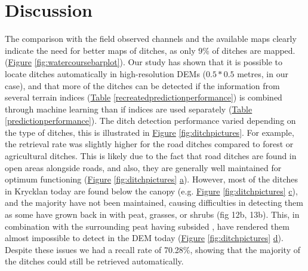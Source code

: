 \documentclass[]{interact}
\theoremstyle{plain}%
\theoremstyle{definition}
\theoremstyle{remark}
\begin{document}
\section{Discussion}

The comparison with the field observed channels and the available maps clearly indicate the need for better maps of ditches, as only 9\% of ditches are mapped.  (\hyperref[fig:watercoursebarplot]{Figure} \ref{fig:watercoursebarplot}). Our study has shown that it is possible to locate ditches automatically in high-resolution DEMs ($0.5  * 0.5 $ metres, in our case), and that more of the ditches can be detected if the information from several terrain indices (\hyperref[recreatedpredictionperformance]{Table} \ref{recreatedpredictionperformance}) is combined through machine learning than if indices are used separately (\hyperref[predictionperformance]{Table} \ref{predictionperformance}).
The ditch detection performance varied depending on the type of ditches, this is illustrated in \hyperref[fig:ditchpictures]{Figure} \ref{fig:ditchpictures}. For example, the retrieval rate was slightly higher for the road ditches compared to forest or agricultural ditches. This is likely due to the fact that  road ditches are found in open areas alongside roads, and also,   they are generally well maintained for optimum functioning (\hyperref[fig:ditchpictures]{Figure} \ref{fig:ditchpictures} \hyperref[fig:ditchpictures]{a}). However, most of the ditches in Krycklan today are found below the canopy (e.g. \hyperref[fig:ditchpictures]{Figure} \ref{fig:ditchpictures} \hyperref[fig:ditchpictures]{c}), and the majority have not been maintained, causing difficulties in detecting them as some have grown back in with peat, grasses, or shrubs (fig 12b, 13b). This, in combination with the surrounding peat having subsided \citep{heikurainen}, have rendered them almost impossible to detect in the DEM today (\hyperref[fig:ditchpictures]{Figure} \ref{fig:ditchpictures} \hyperref[fig:ditchpictures]{d}). Despite these issues we had a recall rate of 70.28\%, showing that the majority of the ditches could still be retrieved automatically.
\end{document}
